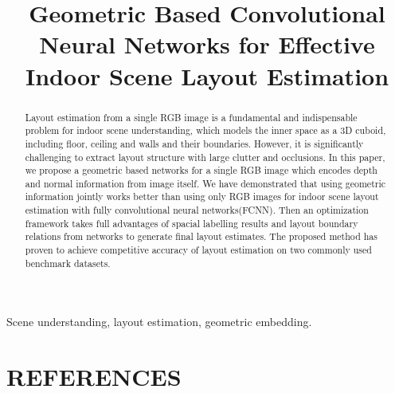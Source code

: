 \documentclass{article}
\title{Geometric Based Convolutional Neural Networks for Effective\\
 Indoor Scene Layout Estimation}
\begin{document}
%
\maketitle
%
\begin{abstract}
Layout estimation from a single RGB image is a fundamental and indispensable problem for indoor scene understanding, which models the inner space as a 3D cuboid, including floor, ceiling and walls and their boundaries. However, it is significantly challenging to extract layout structure with large clutter and occlusions.
In this paper, we propose a geometric based networks for a single RGB image which encodes depth and normal information from image itself. We have demonstrated that using geometric information jointly works better than using only RGB images for indoor scene layout estimation with fully convolutional neural networks(FCNN). Then an optimization framework takes full advantages of spacial labelling results and layout boundary relations from networks to generate final layout estimates. The proposed method has proven to achieve competitive accuracy of layout estimation on two commonly used benchmark datasets.
\end{abstract}
%
\begin{keywords}
   Scene understanding, layout estimation, geometric embedding.
\end{keywords}
%



%




\section{REFERENCES}
\label{sec:ref}



\end{document}
